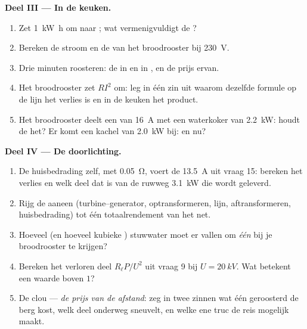 \begin{problem}
\medskip
\noindent\textbf{Deel III --- In de keuken.}
\begin{enumerate}[resume]
  \item Zet \qty{1}{kW.h} om naar ; wat vermenigvuldigt de ?
  \item Bereken de stroom en de  van het broodrooster bij
        \qty{230}{V}.
  \item Drie minuten roosteren: de  in  en in , en
        de prijs ervan.
  \item Het broodrooster zet $RI^2$ om: leg in één zin uit waarom
        dezelfde formule op de lijn het verlies is en in de keuken het
        product.
  \item Het broodrooster deelt een  van \qty{16}{A} met een
        waterkoker van \qty{2.2}{kW}: houdt de  het? Er komt een
        kachel van \qty{2.0}{kW} bij: en nu?
\end{enumerate}

\medskip
\noindent\textbf{Deel IV --- De doorlichting.}
\begin{enumerate}[resume]
  \item De huisbedrading zelf, met  \qty{0.05}{\ohm}, voert de
        \qty{13.5}{A} uit vraag 15: bereken het verlies en welk deel dat
        is van de ruwweg \qty{3.1}{kW} die wordt geleverd.
  \item Rijg de  aaneen (turbine--generator, optransformeren,
        lijn, aftransformeren, huisbedrading) tot één totaalrendement van
        het net.
  \item Hoeveel  (en hoeveel kubieke ) stuwwater moet er
        vallen om \emph{één}  bij je broodrooster te krijgen?
  \item Bereken het verloren deel $R_\ell P/U^2$ uit vraag 9 bij
        $U = \qty{20}{kV}$. Wat betekent een waarde boven $1$?
  \item De clou --- \emph{de prijs van de afstand}: zeg in twee zinnen
        wat één geroosterd  de berg kost, welk deel onderweg
        sneuvelt, en welke ene truc de reis mogelijk maakt.
\end{enumerate}
\end{problem}

